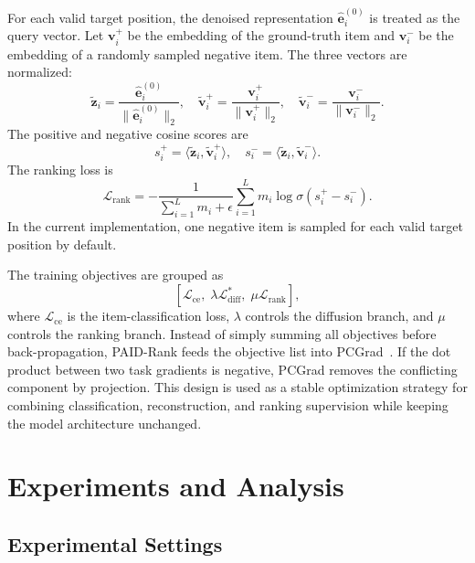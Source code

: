 \documentclass[runningheads,a4paper]{llncs}
\begin{document}
For each valid target position, the denoised representation $\hat{\mathbf{e}}^{(0)}_i$ is treated as the query vector. Let $\mathbf{v}_i^+$ be the embedding of the ground-truth item and $\mathbf{v}_i^-$ be the embedding of a randomly sampled negative item. The three vectors are normalized:
\begin{equation}
    \tilde{\mathbf{z}}_i=\frac{\hat{\mathbf{e}}^{(0)}_i}{\|\hat{\mathbf{e}}^{(0)}_i\|_2},\quad
    \tilde{\mathbf{v}}^+_i=\frac{\mathbf{v}^+_i}{\|\mathbf{v}^+_i\|_2},\quad
    \tilde{\mathbf{v}}^-_i=\frac{\mathbf{v}^-_i}{\|\mathbf{v}^-_i\|_2}.
\end{equation}
The positive and negative cosine scores are
\begin{equation}
    s_i^+=\langle\tilde{\mathbf{z}}_i,\tilde{\mathbf{v}}^+_i\rangle,
    \quad
    s_i^-=\langle\tilde{\mathbf{z}}_i,\tilde{\mathbf{v}}^-_i\rangle.
\end{equation}
The ranking loss is
\begin{equation}
    \mathcal{L}_{\mathrm{rank}}=-\frac{1}{\sum_{i=1}^{L}m_i+\epsilon}
    \sum_{i=1}^{L}m_i\log\sigma(s_i^+-s_i^-).
    \label{eq:rank_loss}
\end{equation}
In the current implementation, one negative item is sampled for each valid target position by default.

The training objectives are grouped as
\begin{equation}
    \left[\mathcal{L}_{\mathrm{ce}},\;\lambda\mathcal{L}^{*}_{\mathrm{diff}},\;\mu\mathcal{L}_{\mathrm{rank}}\right],
    \label{eq:pcgrad_objectives}
\end{equation}
where $\mathcal{L}_{\mathrm{ce}}$ is the item-classification loss, $\lambda$ controls the diffusion branch, and $\mu$ controls the ranking branch. Instead of simply summing all objectives before back-propagation, PAID-Rank feeds the objective list into PCGrad~\cite{yu2020pcgrad}. If the dot product between two task gradients is negative, PCGrad removes the conflicting component by projection. This design is used as a stable optimization strategy for combining classification, reconstruction, and ranking supervision while keeping the model architecture unchanged.

\section{Experiments and Analysis}
\label{sec:experiments}

\subsection{Experimental Settings}
\label{subsec:settings}
\end{document}
